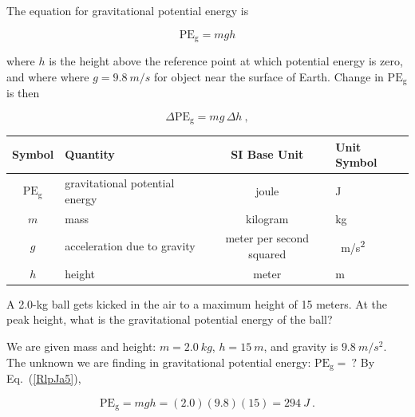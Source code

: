 \documentclass{article}
\numberwithin{equation}{section}
\numberwithin{figure}{section}
\begin{document}
The equation for gravitational potential energy is

\begin{equation} \label{RlpJa5}
    \mathrm{PE_g} = mgh
\end{equation}

where $h$ is the height above the reference point at which potential energy is zero, and where where $g = \SI{9.8}{m/s}$ for object near the surface of Earth. Change in $\mathrm{PE_g}$ is then

\begin{equation} 
    \Delta\mathrm{PE_g} = m g\,\Delta h\ ,
\end{equation}

\begin{center}
    \begin{tabular}{cl|cl}
    \hline
    \textbf{Symbol} & \textbf{Quantity} & \textbf{SI Base Unit} & \textbf{Unit Symbol}  \\
    \hline\hline
    \rule{0pt}{2.5ex}
        $\mathrm{PE_g}$ & gravitational potential energy & joule & J\\
        $m$ & mass & kilogram & kg\\
        $g$ & acceleration due to gravity & meter per second squared & \SI{}{m/s^2}\\
        $h$ & height & meter & m\\
    \hline
    \end{tabular}
\end{center}

\cyanhrule

\begin{example} \label{J1Qehp}
A 2.0-kg ball gets kicked in the air to a maximum height of 15 meters. At the peak height, what is the gravitational potential energy of the ball?
\end{example}

\Solution We are given mass and height: $m = \SI{2.0}{kg}$, $h = \SI{15}{m}$, and gravity is $\SI{9.8}{m/s^2}$. The unknown we are finding in gravitational potential energy: $\mathrm{PE_g} =\ ?$ By Eq.~(\ref{RlpJa5}),

\begin{equation*}
    \mathrm{PE_g} = m g h = (2.0)(9.8)(15) =  \SI{294}{J} \ .
\end{equation*}

\cyanhrule

\end{document}
